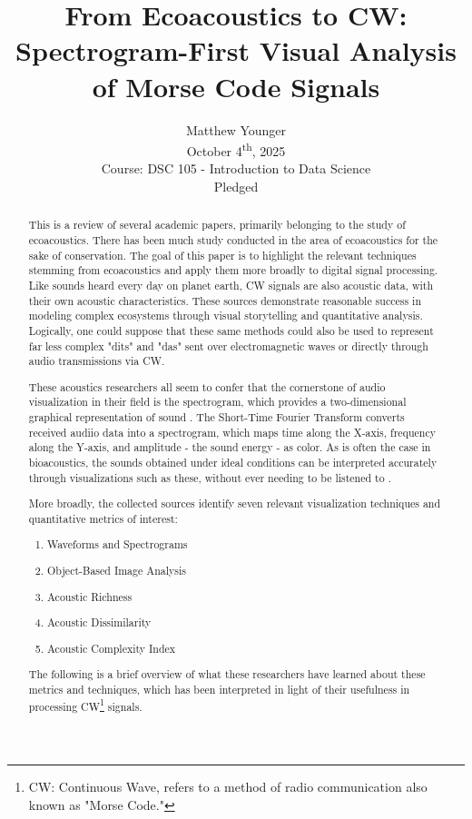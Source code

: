 \documentclass[letterpaper, 12 pt, conference]{ieeeconf}
\title{\LARGE \bf
From Ecoacoustics to CW: Spectrogram-First Visual Analysis of Morse Code Signals
}
\author{Matthew Younger\\%
October 4\textsuperscript{th}, 2025\\
Course: DSC 105 - Introduction to Data Science\\
Pledged
}
\begin{document}
\maketitle
\thispagestyle{empty}
\pagestyle{empty}

\begin{abstract}
    This is a review of several academic papers, primarily belonging to the study of ecoacoustics. There has been much study conducted in the area of ecoacoustics for the sake of conservation. The goal of this paper is to highlight the relevant techniques stemming from ecoacoustics and apply them more broadly to digital signal processing. Like sounds heard every day on planet earth, CW signals are also acoustic data, with their own acoustic characteristics. These sources demonstrate reasonable success in modeling complex ecosystems through visual storytelling and quantitative analysis. Logically, one could suppose that these same methods could also be used to represent far less complex "dits" and "das" sent over electromagnetic waves or directly through audio transmissions via CW.

    These acoustics researchers all seem to confer that the cornerstone of audio visualization in their field is the spectrogram, which provides a two-dimensional graphical representation of sound \autocite{zhao}. The Short-Time Fourier Transform converts received audiio data into a spectrogram, which maps time along the X-axis, frequency along the Y-axis, and amplitude - the sound energy - as color. As is often the case in bioacoustics, the sounds obtained under ideal conditions can be interpreted accurately through visualizations such as these, without ever needing to be listened to \autocite{Ibiashi}.

    More broadly, the collected sources identify seven relevant visualization techniques and quantitative metrics of interest:
\begin{enumerate}
  \item Waveforms and Spectrograms
  \item Object-Based Image Analysis
  \item Acoustic Richness
  \item Acoustic Dissimilarity
  \item Acoustic Complexity Index
\end{enumerate}

    The following is a brief overview of what these researchers have learned about these metrics and techniques, which has been interpreted in light of their usefulness in processing CW\footnote{CW: Continuous Wave, refers to a method of radio communication also known as "Morse Code."} signals.
\end{abstract}
\end{document}
